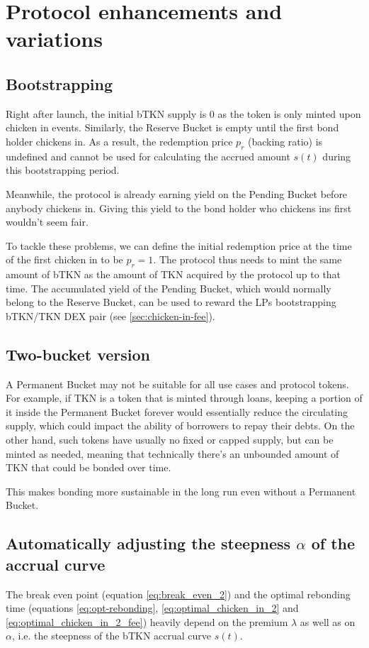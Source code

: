 \documentclass{article}
\begin{document}
\section{Protocol enhancements and variations}
\subsection{Bootstrapping}
  \label{sec:bootstrapping}
Right after launch, the initial bTKN supply is 0 as the token is only minted upon chicken in events. Similarly, the Reserve Bucket is empty until the first bond holder chickens in. As a result, the redemption price $p_r$ (backing ratio) is undefined and cannot be used for calculating the accrued amount $s(t)$ during this bootstrapping period.

Meanwhile, the protocol is already earning yield on the Pending Bucket before anybody chickens in. Giving this yield to the bond holder who chickens ins first wouldn't seem fair. 

To tackle these problems, we can define the initial redemption price at the time of the first chicken in to be $p_r = 1$. The protocol thus needs to mint the same amount of bTKN as the amount of TKN acquired by the protocol up to that time. The accumulated yield of the Pending Bucket, which would normally belong to the Reserve Bucket, can be used to reward the LPs bootstrapping bTKN/TKN DEX pair (see \ref{sec:chicken-in-fee}).

\subsection{Two-bucket version}
\label{sec:two-bucket}
A Permanent Bucket may not be suitable for all use cases and protocol tokens. For example, if TKN is a token that is minted through loans, keeping a portion of it inside the Permanent Bucket forever would essentially reduce the circulating supply, which could impact the ability of borrowers to repay their debts. On the other hand, such tokens have usually no fixed or capped supply, but can be minted as needed, meaning that technically there's an unbounded amount of TKN that could be bonded over time.

This makes bonding more sustainable in the long run even without a Permanent Bucket.


\subsection{Automatically adjusting the steepness $\alpha$ of the accrual curve}
  \label{sec:adjustment}
The break even point (equation \ref{eq:break_even_2}) and the optimal rebonding time (equations \ref{eq:opt-rebonding}, \ref{eq:optimal_chicken_in_2} and \ref{eq:optimal_chicken_in_2_fee}) heavily depend on the premium $\lambda$ as well as on $\alpha$, i.e. the steepness of the bTKN accrual curve $s(t)$. 
\end{document}
